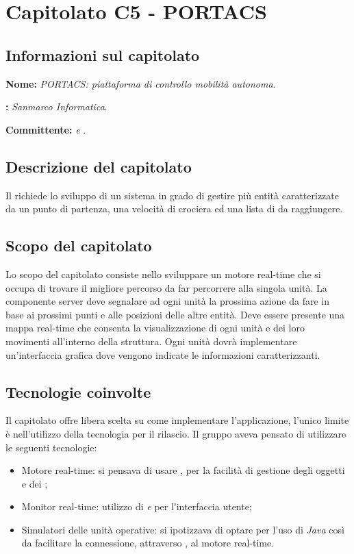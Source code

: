 \section{Capitolato C5 - PORTACS}\label{C5}
\subsection{Informazioni sul capitolato}
\begin{description}
	\item \textbf{Nome:} \textit{PORTACS: piattaforma di controllo mobilità autonoma}.
	\item \textbf{:} \textit{Sanmarco Informatica}.
	\item \textbf{Committente:} \textit{\VT{} e \CR{}}.
\end{description}

\subsection{Descrizione del capitolato}
Il  richiede lo sviluppo di un sistema  in grado di gestire più entità caratterizzate da un punto di partenza, una velocità di crociera ed una lista di  da raggiungere.

\subsection{Scopo del capitolato}
Lo scopo del capitolato consiste nello sviluppare un motore real-time che si occupa di trovare il migliore percorso da far percorrere alla singola unità.
La componente server deve segnalare ad ogni unità la prossima azione da fare in base ai prossimi punti e alle posizioni delle altre entità. Deve essere presente una mappa real-time che consenta la visualizzazione di ogni unità e dei loro movimenti all'interno della struttura.
Ogni unità dovrà implementare un'interfaccia grafica dove vengono indicate le informazioni caratterizzanti.

\subsection{Tecnologie coinvolte}
Il capitolato offre libera scelta su come implementare l'applicazione, l'unico limite è nell'utilizzo della tecnologia \textit{} per il rilascio. Il gruppo aveva pensato di utilizzare le seguenti tecnologie:
\begin{itemize}
	\item Motore real-time: si pensava di usare \textit{}, per la facilità di gestione degli oggetti e dei ;
	\item Monitor real-time: utilizzo di \textit{ e } per l'interfaccia utente;
	\item Simulatori delle unità operative: si ipotizzava di optare per l'uso di \textit{Java} così da facilitare la connessione, attraverso , al motore real-time.
\end{itemize}

